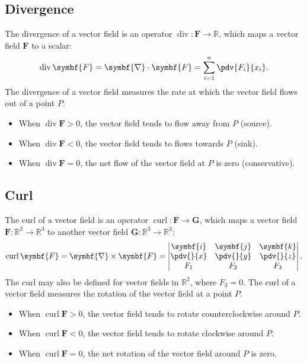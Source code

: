 \documentclass{article}
\DeclareMathOperator{\divergence}{div}
\DeclareMathOperator{\curl}{curl}
\begin{document}
\subsection{Divergence}
The divergence of a vector field is an operator \(\divergence :
\symbf{F} \to \mathbb{R}\), which maps a vector field \(\symbf{F}\) to
a scalar:
\begin{equation*}
    \divergence \symbf{F} = \symbf{\nabla} \cdot \symbf{F} = \sum_{i=1}^{n} \pdv{F_i}{x_i}.
\end{equation*}
The divergence of a vector field measures the rate at which the vector
field flows out of a point \(P\).
\begin{itemize}
    \item When \(\divergence \symbf{F} > 0\), the vector field tends to
          flow away from \(P\) (source).
    \item When \(\divergence \symbf{F} < 0\), the vector field tends to
          flows towards \(P\) (sink).
    \item When \(\divergence \symbf{F} = 0\), the net flow of the
          vector field at \(P\) is zero (conservative).
\end{itemize}
\subsection{Curl}
The curl of a vector field is an operator \(\curl : \symbf{F} \to
\symbf{G}\), which maps a vector field \(\symbf{F} : \mathbb{R}^3 \to
\mathbb{R}^3\) to another vector field \(\symbf{G} : \mathbb{R}^3 \to
\mathbb{R}^3\):
\begin{equation*}
    \curl \symbf{F} = \symbf{\nabla} \times \symbf{F} =
    \begin{vmatrix}
        \symbf{i}              & \symbf{j}              & \symbf{k}              \\
        \displaystyle\pdv{}{x} & \displaystyle\pdv{}{y} & \displaystyle\pdv{}{z} \\
        F_1                    & F_2                    & F_3
    \end{vmatrix}
    .
\end{equation*}
The curl may also be defined for vector fields in \(\mathbb{R}^2\), where
\(F_3 = 0\). The curl of a vector field measures the rotation of the
vector field at a point \(P\).
\begin{itemize}
    \item When \(\curl \symbf{F} > 0\), the vector field tends to
          rotate counterclockwise around \(P\).
    \item When \(\curl \symbf{F} < 0\), the vector field tends to
          rotate clockwise around \(P\).
    \item When \(\curl \symbf{F} = 0\), the net rotation of the vector
          field around \(P\) is zero.
\end{itemize}
\end{document}
